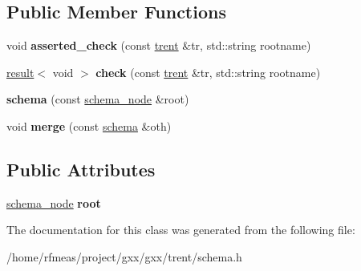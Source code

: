 \subsection*{Public Member Functions}
\begin{DoxyCompactItemize}
\item 
void {\bfseries asserted\+\_\+check} (const \hyperlink{classgxx_1_1trent}{trent} \&tr, std\+::string rootname)\hypertarget{classgxx_1_1schema_a985679f0fbe5432669529c85e3c73ac1}{}\label{classgxx_1_1schema_a985679f0fbe5432669529c85e3c73ac1}

\item 
\hyperlink{classgxx_1_1result__type_1_1result}{result}$<$ void $>$ {\bfseries check} (const \hyperlink{classgxx_1_1trent}{trent} \&tr, std\+::string rootname)\hypertarget{classgxx_1_1schema_a1149976a0f1a296cfb4d72987c602a1d}{}\label{classgxx_1_1schema_a1149976a0f1a296cfb4d72987c602a1d}

\item 
{\bfseries schema} (const \hyperlink{classgxx_1_1schema_1_1schema__node}{schema\+\_\+node} \&root)\hypertarget{classgxx_1_1schema_a3dc6fb71da85fae7a5ff3d2ad2747fd8}{}\label{classgxx_1_1schema_a3dc6fb71da85fae7a5ff3d2ad2747fd8}

\item 
void {\bfseries merge} (const \hyperlink{classgxx_1_1schema}{schema} \&oth)\hypertarget{classgxx_1_1schema_a9ae168b47d8dd294a37b8b39b68dcf47}{}\label{classgxx_1_1schema_a9ae168b47d8dd294a37b8b39b68dcf47}

\end{DoxyCompactItemize}
\subsection*{Public Attributes}
\begin{DoxyCompactItemize}
\item 
\hyperlink{classgxx_1_1schema_1_1schema__node}{schema\+\_\+node} {\bfseries root}\hypertarget{classgxx_1_1schema_abcaa26ebccd723cddaa029af8c6a72c5}{}\label{classgxx_1_1schema_abcaa26ebccd723cddaa029af8c6a72c5}

\end{DoxyCompactItemize}


The documentation for this class was generated from the following file\+:\begin{DoxyCompactItemize}
\item 
/home/rfmeas/project/gxx/gxx/trent/schema.\+h\end{DoxyCompactItemize}
